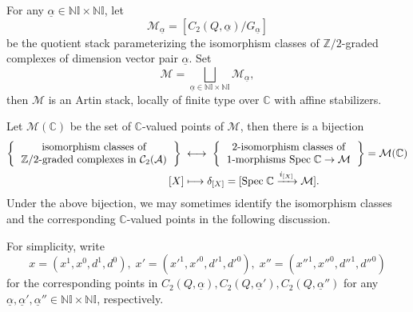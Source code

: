 \documentclass[12pt]{amsart}
\theoremstyle{definition}
\numberwithin{equation}{section}
\begin{document}
For any $\underline{\alpha} \in \mathbb{N}\mathbb{I} \times \mathbb{N}\mathbb{I} $, let
\[\mathcal{M}_{\underline{\alpha}} = [C_2(Q,\underline{\alpha})/G_{\underline{\alpha}}] 
\]
be the quotient stack parameterizing the isomorphism classes of $\mathbb{Z}/2 $-graded complexes of dimension vector pair $ \underline{\alpha} $. 
Set
\[
\mathcal{M} = \bigsqcup_{\underline{\alpha} \in \mathbb{N}\mathbb{I} \times \mathbb{N}\mathbb{I} } \mathcal{M}_{\underline{\alpha}},
\]
then $ \mathcal{M} $ is an Artin stack, locally of finite type over $ \mathbb{C} $ with affine stabilizers.

Let $ \mathcal{M}(\mathbb{C}) $ be the set of $ \mathbb{C} $-valued points of $ \mathcal{M} $, then there is a bijection
\begin{align*}
    \left\{
  \begin{tabular}{c}
      isomorphism classes of   \\
      $\mathbb{Z}/2$-graded complexes in $\mathcal{C}_2(\mathcal{A})$
  \end{tabular}
\right\}
\;&\longleftrightarrow\;
\left\{
\begin{tabular}{c}
      2-isomorphism classes of   \\
      1-morphisms $ \mathrm{Spec}\;\mathbb{C} \to \mathcal{M} $
  \end{tabular}
\right\} = \mathcal{M}(\mathbb{C})
\\
[X] &\longmapsto \delta_{[X]} = [\mathrm{Spec}\;\mathbb{C} \xrightarrow{i_{[X]}} \mathcal{M}].
\end{align*}
Under the above bijection, we may sometimes identify the isomorphism classes and the corresponding $ \mathbb{C} $-valued points in the following discussion.

For simplicity, write
\[x=(x^1,x^0,d^1,d^0),\;x'=(x'^1,x'^0,d'^1,d'^0),\; x''=(x''^1,x''^0,d''^1,d''^0)\]
for the corresponding points in $ C_2(Q,\underline{\alpha}),C_2(Q,\underline{\alpha}'),C_2(Q,\underline{\alpha}'') $ for any $ \underline{\alpha},\underline{\alpha}',\underline{\alpha}'' \in \mathbb{N}\mathbb{I} \times \mathbb{N}\mathbb{I} $, respectively.
\end{document}
